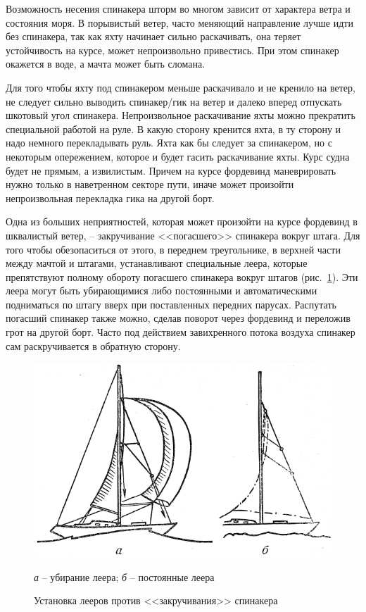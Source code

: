 \documentclass[a4paper, 12pt, twoside, final, book, russian, fittopage, cyremdash]{ncc}
\newcommand{\ris}[1]{\ref{fig:#1}}
\begin{document}
Возможность несения спинакера шторм во многом зависит от характера ветра и состояния моря. В порывистый ветер, часто меняющий направление лучше идти без спинакера, так как яхту начинает сильно раскачивать, она теряет устойчивость на курсе, может непроизвольно привестись. При этом спинакер окажется в воде, а мачта может быть сломана.

Для того чтобы яхту под спинакером меньше раскачивало и не кренило на ветер, не следует сильно выводить спинакер\-/гик на ветер и далеко вперед отпускать шкотовый угол спинакера. Непроизвольное раскачивание яхты можно прекратить специальной работой на руле. В какую сторону кренится яхта, в ту сторону и надо немного перекладывать руль. Яхта как бы следует за спинакером, но с некоторым опережением, которое и будет гасить раскачивание яхты. Курс судна будет не прямым, а извилистым. Причем на курсе фордевинд маневрировать нужно только в наветренном секторе пути, иначе может произойти непроизвольная перекладка гика на другой борт.

Одна из больших неприятностей, которая может произойти на курсе фордевинд в шквалистый ветер, \--- закручивание <<погасшего>> спинакера вокруг штага. Для того чтобы обезопаситься от этого, в переднем треугольнике, в верхней части между мачтой и штагами, устанавливают специальные леера, которые препятствуют полному обороту погасшего спинакера вокруг штагов (рис.~\ris{144}). Эти леера могут быть убирающимися либо постоянными и автоматическими подниматься по штагу вверх при поставленных передних парусах. Распутать погасший спинакер также можно, сделав поворот через фордевинд и переложив грот на другой борт. Часто под действием завихренного потока воздуха спинакер сам раскручивается в обратную сторону.

\begin{figure}[htb]
  \centering{}
  \includegraphics[scale=1.3]{0144P}
  \caption{Установка лееров против <<закручивания>> спинакера}
  \label{fig:144}
  \small
  \centering{}
  \textit{а} \--- убирание леера; \textit{б} \--- постоянные леера
\end{figure}
\end{document}

